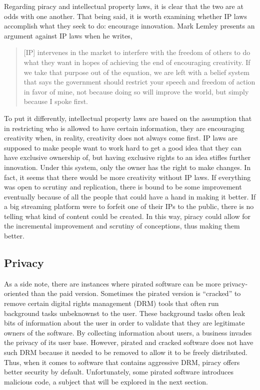 \documentclass[onecolumn, 12pt]{article}
\begin{document}
Regarding piracy and intellectual property laws, it is clear that the two are at odds with
one another. That being said, it is worth examining whether IP laws accomplish what they
seek to do: encourage innovation. Mark Lemley presents an argument against IP laws when he
writes, \blockcquote[1339]{lemley:faith-based}{[IP] intervenes in the market to interfere
with the freedom of others to do what they want in hopes of achieving the end of
encouraging creativity. If we take that purpose out of the equation, we are left with a
belief system that says the government should restrict your speech and freedom of action
in favor of mine, not because doing so will improve the world, but simply because I spoke
first.} 
To put it differently, intellectual property laws are based on the assumption that in
restricting who is allowed to have certain information, they are encouraging creativity
when, in reality, creativity does not always come first. IP laws are supposed to make
people want to work hard to get a good idea that they can have exclusive ownership of, but
having exclusive rights to an idea stifles further innovation. Under this system, only the
owner has the right to make changes. In fact, it seems that there would be more creativity
without IP laws. If everything was open to scrutiny and replication, there is bound to be
some improvement eventually because of all the people that could have a hand in making it
better. If a big streaming platform were to forfeit one of their IPs to the public, there
is no telling what kind of content could be created. In this way, piracy could allow for
the incremental improvement and scrutiny of conceptions, thus making them better.

\subsection{Privacy}
As a side note, there are instances where pirated software can be more privacy-oriented
than the paid version. Sometimes the pirated version is ``cracked'' to remove certain
digital rights management (DRM) tools that often run background tasks unbeknownst to the
user. These background tasks often leak bits of information about the user in order to
validate that they are legitimate owners of the software. By collecting information about
users, a business invades the privacy of its user base. However, pirated and cracked
software does not have such DRM because it needed to be removed to allow it to be freely
distributed. Thus, when it comes to software that contains aggressive DRM, piracy offers
better security by default. Unfortunately, some pirated software introduces malicious
code, a subject that will be explored in the next section.
\end{document}

